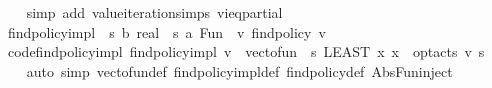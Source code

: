 \begin{isabellebody}
%
\isadelimproof
\ \ %
\endisadelimproof
%
\isatagproof
{}\isamarkupfalse%
\ {\isacharparenleft}{\kern0pt}simp\ add{\isacharcolon}{\kern0pt}\ value{\isacharunderscore}{\kern0pt}iteration{\isachardot}{\kern0pt}simps\ vi{\isacharunderscore}{\kern0pt}eq{\isacharunderscore}{\kern0pt}partial{\isacharparenright}{\kern0pt}%
\endisatagproof
{\isafoldproof}%
%
\isadelimproof
\isanewline
%
\endisadelimproof
\isanewline
{}\isamarkupfalse%
\ find{\isacharunderscore}{\kern0pt}policy{\isacharunderscore}{\kern0pt}impl\ {\isacharcolon}{\kern0pt}{\isacharcolon}{\kern0pt}\ {\isachardoublequoteopen}{\isacharparenleft}{\kern0pt}{\isacharprime}{\kern0pt}s\ {\isasymRightarrow}\isactrlsub b\ real{\isacharparenright}{\kern0pt}\ {\isasymRightarrow}\ {\isacharparenleft}{\kern0pt}{\isacharprime}{\kern0pt}s{\isacharcomma}{\kern0pt}\ {\isacharprime}{\kern0pt}a{\isacharparenright}{\kern0pt}\ Fun{\isachardoublequoteclose}\ \ {\isachardoublequoteopen}{\isasymlambda}v{\isachardot}{\kern0pt}\ find{\isacharunderscore}{\kern0pt}policy{\isacharprime}{\kern0pt}\ v{\isachardoublequoteclose}%
\isadelimproof
%
\endisadelimproof
%
\isatagproof
\isacommand{{\isachardot}{\kern0pt}}\isamarkupfalse%
%
\endisatagproof
{\isafoldproof}%
%
\isadelimproof
%
\endisadelimproof
\isanewline
{}\isamarkupfalse%
\ code{\isacharunderscore}{\kern0pt}find{\isacharunderscore}{\kern0pt}policy{\isacharunderscore}{\kern0pt}impl{\isacharcolon}{\kern0pt}\ {\isachardoublequoteopen}find{\isacharunderscore}{\kern0pt}policy{\isacharunderscore}{\kern0pt}impl\ v\ {\isacharequal}{\kern0pt}\ vec{\isacharunderscore}{\kern0pt}to{\isacharunderscore}{\kern0pt}fun\ {\isacharparenleft}{\kern0pt}{\isasymchi}\ s{\isachardot}{\kern0pt}\ {\isacharparenleft}{\kern0pt}LEAST\ x{\isachardot}{\kern0pt}\ x\ {\isasymin}\ opt{\isacharunderscore}{\kern0pt}acts\ v\ s{\isacharparenright}{\kern0pt}{\isacharparenright}{\kern0pt}{\isachardoublequoteclose}\ \isanewline
%
\isadelimproof
\ \ %
\endisadelimproof
%
\isatagproof
{}\isamarkupfalse%
\ {\isacharparenleft}{\kern0pt}auto\ simp{\isacharcolon}{\kern0pt}\ vec{\isacharunderscore}{\kern0pt}to{\isacharunderscore}{\kern0pt}fun{\isacharunderscore}{\kern0pt}def\ find{\isacharunderscore}{\kern0pt}policy{\isacharunderscore}{\kern0pt}impl{\isacharunderscore}{\kern0pt}def\ find{\isacharunderscore}{\kern0pt}policy{\isacharprime}{\kern0pt}{\isacharunderscore}{\kern0pt}def\ Abs{\isacharunderscore}{\kern0pt}Fun{\isacharunderscore}{\kern0pt}inject{\isacharparenright}{\kern0pt}%
\endisatagproof
{\isafoldproof}%

\end{isabellebody}
